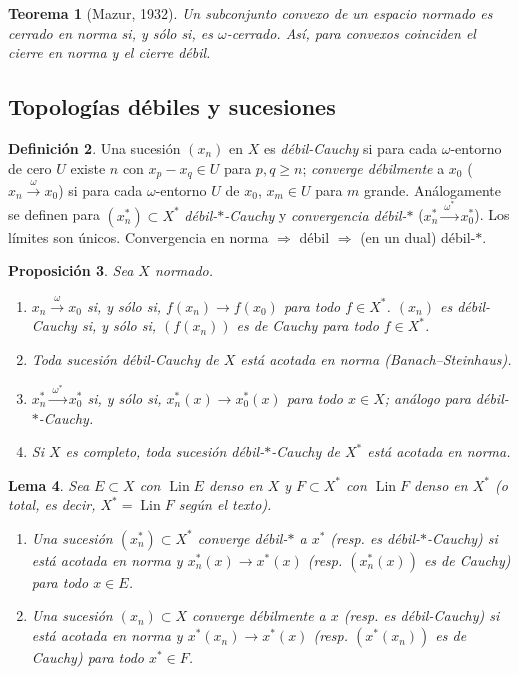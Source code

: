 \documentclass[11pt,a4paper]{article}
\newcommand{\Lin}{\operatorname{Lin}}
\newcommand{\wto}{\xrightarrow{\ \omega\ }}
\newcommand{\wsto}{\xrightarrow{\ \omega^*\ }}
\theoremstyle{plain}
\newtheorem{teorema}{Teorema}[section]
\newtheorem{lema}[teorema]{Lema}
\newtheorem{proposicion}[teorema]{Proposición}
\theoremstyle{definition}
\newtheorem{definicion}[teorema]{Definición}
\theoremstyle{remark}
\begin{document}
\begin{teorema}[Mazur, 1932]
Un subconjunto convexo de un espacio normado es cerrado en norma si, y sólo si, es $\omega$-cerrado. Así, para convexos coinciden el cierre en norma y el cierre débil.
\end{teorema}

\subsection{Topologías débiles y sucesiones}

\begin{definicion}
Una sucesión $(x_n)$ en $X$ es \emph{débil-Cauchy} si para cada $\omega$-entorno de cero $U$ existe $n$ con $x_p-x_q\in U$ para $p,q\ge n$; \emph{converge débilmente} a $x_0$ ($x_n\wto x_0$) si para cada $\omega$-entorno $U$ de $x_0$, $x_m\in U$ para $m$ grande. Análogamente se definen para $(x_n^*)\subset X^*$ \emph{débil-$*$-Cauchy} y \emph{convergencia débil-$*$} ($x_n^*\wsto x_0^*$). Los límites son únicos. Convergencia en norma $\Rightarrow$ débil $\Rightarrow$ (en un dual) débil-$*$.
\end{definicion}

\begin{proposicion}
Sea $X$ normado.
\begin{enumerate}[label=(\alph*)]
\item $x_n\wto x_0$ si, y sólo si, $f(x_n)\to f(x_0)$ para todo $f\in X^*$. $(x_n)$ es débil-Cauchy si, y sólo si, $(f(x_n))$ es de Cauchy para todo $f\in X^*$.
\item Toda sucesión débil-Cauchy de $X$ está acotada en norma (Banach--Steinhaus).
\item $x_n^*\wsto x_0^*$ si, y sólo si, $x_n^*(x)\to x_0^*(x)$ para todo $x\in X$; análogo para débil-$*$-Cauchy.
\item Si $X$ es completo, toda sucesión débil-$*$-Cauchy de $X^*$ está acotada en norma.
\end{enumerate}
\end{proposicion}

\begin{lema}
Sea $E\subset X$ con $\Lin E$ denso en $X$ y $F\subset X^*$ con $\Lin F$ denso en $X^*$ (o total, es decir, $X^*=\Lin F$ según el texto).
\begin{enumerate}[label=(\alph*)]
\item Una sucesión $(x_n^*)\subset X^*$ converge débil-$*$ a $x^*$ (resp. es débil-$*$-Cauchy) si está acotada en norma y $x_n^*(x)\to x^*(x)$ (resp. $(x_n^*(x))$ es de Cauchy) para todo $x\in E$.
\item Una sucesión $(x_n)\subset X$ converge débilmente a $x$ (resp. es débil-Cauchy) si está acotada en norma y $x^*(x_n)\to x^*(x)$ (resp. $(x^*(x_n))$ es de Cauchy) para todo $x^*\in F$.
\end{enumerate}
\end{lema}
\end{document}
